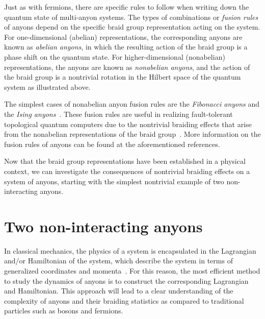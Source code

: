 Just as with fermions, there are specific rules to follow when writing down the quantum state of multi-anyon systems. The types of combinations or \textit{fusion rules} of anyons depend on the specific braid group representation acting on the system. For one-dimensional (abelian) representations, the corresponding anyons are known as \textit{abelian anyons}, in which the resulting action of the braid group is a phase shift on the quantum state. For higher-dimensional (nonabelian) representations, the anyons are known as \textit{nonabelian anyons}, and the action of the braid group is a nontrivial rotation in the Hilbert space of the quantum system as illustrated above.

The simplest cases of nonabelian anyon fusion rules are the \textit{Fibonacci anyons} and the \textit{Ising anyons}~\cite{Deshmukh,Trebst2008,Ville2017}. These fusion rules are useful in realizing fault-tolerant topological quantum computers due to the nontrivial braiding effects that arise from the nonabelian representations of the braid group~\cite{Ville2017,Bernard2018,Delaney2016}. More information on the fusion rules of anyons can be found at the aforementioned references.

Now that the braid group representations have been established in a physical context, we can investigate the consequences of nontrivial braiding effects on a system of anyons, starting with the simplest nontrivial example of two non-interacting anyons.

\section{Two non-interacting anyons}\label{sec:non_int}

In classical mechanics, the physics of a system is encapsulated in the Lagrangian and/or Hamiltonian of the system, which describe the system in terms of generalized coordinates and momenta~\cite{Taylor2005}. For this reason, the most efficient method to study the dynamics of anyons is to construct the corresponding Lagrangian and Hamiltonian. This approach will lead to a clear understanding of the complexity of anyons and their braiding statistics as compared to traditional particles such as bosons and fermions.

